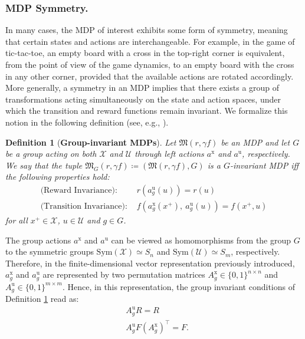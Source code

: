 \documentclass[10pt,leqno]{amsart}
\newcommand{\repr}[1]{a^{#1}}
\newcommand{\reprarg}[2]{\repr{#1}_{#2}}
\newcommand{\T}{^\top}
\newcommand{\U}{\mathcal{U}}
\newcommand{\X}{\mathcal{X}}
\newcommand{\cost}{r}
\newcommand{\Cost}{R}
\newcommand{\f}{f}
\newcommand{\F}{F}
\newcommand{\state}{x} %
\newcommand{\act}{u}   %
\newcommand{\disc}{\gamma}
\newcommand{\mdp}{\mathfrak{M}}
\newcommand{\mdparg}[2]{\mdp\left(#1, #2\right)}
\newtheorem{definition}[theorem]{Definition}
\begin{document}
\subsubsection*{MDP Symmetry.}
In many cases, the MDP of interest exhibits some form of symmetry, meaning that certain states and actions are interchangeable. For example, in the game of tic-tac-toe, an empty board with a cross in the top-right corner is equivalent, from the point of view of the game dynamics, to an empty board with the cross in any other corner, provided that the available actions are rotated accordingly. More generally, a symmetry in an MDP implies that there exists a group of transformations acting simultaneously on the state and action spaces, under which the transition and reward functions remain invariant. We formalize this notion in the following definition (see, e.g., \cite{van2020mdp}).
\begin{definition}[\textbf{Group-invariant MDPs}]\label{def:group_invariant_mdp}
    Let $\mdparg{\cost}{\disc \f}$ be an MDP and let $G$ be a group acting on both $\X$ and $\U$ through left actions $\reprarg{\mathrm{x}}{}$ and $\reprarg{\mathrm{u}}{}$, respectively. We say that the tuple $\mdp_G(\cost, \disc \f) \coloneqq (\mdparg{\cost}{\disc \f}, G)$ is a $G$-invariant MDP iff the following properties hold:
    \begin{align*}
        \text{(Reward Invariance): }& \cost\left(\reprarg{\mathrm{u}}{g}(\act)\right) = \cost(\act)\\
        \text{(Transition Invariance): }& \f\left( \reprarg{\mathrm{x}}{g}(\state^+),~ \reprarg{\mathrm{u}}{g}(\act) \right) = \f(\state^+, \act)
    \end{align*}
    for all $\state^+ \in \X$, $\act \in \U$ and $g \in G$.
\end{definition}
%
%
%
\noindent
The group actions $\reprarg{\mathrm{x}}{}$ and $\reprarg{\mathrm{u}}{}$ can be viewed as homomorphisms from the group $G$ to the symmetric groups $\text{Sym}(\X) \simeq S_n$ and $\text{Sym}(\U) \simeq S_m$, respectively. Therefore, in the finite-dimensional vector representation previously introduced, $\reprarg{\mathrm{x}}{g}$ and $\reprarg{\mathrm{u}}{g}$ are represented by two permutation matrices $A_g^{\mathrm{x}} \in \{0, 1\}^{n\times n}$ and $A_g^{\mathrm{u}} \in \{0, 1\}^{m\times m}$. Hence, in this representation, the group invariant conditions of Definition \ref{def:group_invariant_mdp} read as:
\begin{subequations}\label{eq:group_invariant_mdp_vector_form}
    \begin{align}
        &A_g^{\mathrm{u}} \Cost = \Cost\\
        &A_g^{\mathrm{u}} \F \left(A_g^{\mathrm{x}}\right)\T = \F.
    \end{align}
\end{subequations}
\end{document}
